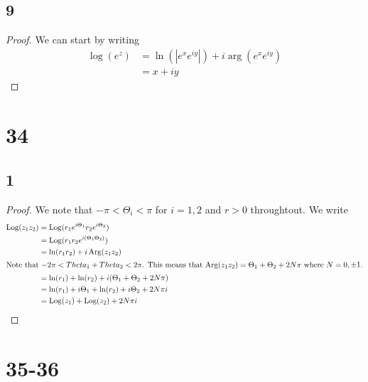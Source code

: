 \documentclass{article}
\DeclareMathOperator*{\Log}{Log}
\DeclareMathOperator*{\Arg}{Arg}
\begin{document}
\subsection*{9} %
\begin{proof}
    We can start by writing
    \begin{align*}
        \log(e^z) & = \ln(|e^xe^{iy}|) + i\arg(e^xe^{iy}) \\
                  & = x + iy
    \end{align*}
\end{proof}
\section*{34}
\subsection*{1}
\begin{proof}
    We note that $-\pi < \Theta_i < \pi$ for $i=1,2$ and $r > 0$ throughtout. We write
    \begin{align*}
        \Log(z_1z_2) & = \Log(r_1e^{i\Theta_1}r_2e^{i\Theta_2})                \\
                     & = \Log(r_1r_2e^{i(\Theta_1\Theta_2)})                   \\
                     & = \ln(r_1r_2) + i\Arg(z_1z_2)                           \\
        \intertext{Note that $-2\pi < Theta_1 + Theta_2 < 2\pi$. This
            means that $\Arg(z_1z_2) = \Theta_1 + \Theta_2 + 2N\pi$ where
            $N = 0, \pm 1$.}
                     & = \ln(r_1) + \ln(r_2) + i(\Theta_1 + \Theta_2 + 2N\pi)  \\
                     & = \ln(r_1) + i\Theta_1 + \ln(r_2) + i\Theta_2 + 2N\pi i \\
                     & = \Log(z_1) + \Log(z_2) + 2N\pi i
    \end{align*}
\end{proof}
\section*{35-36}
\end{document}
